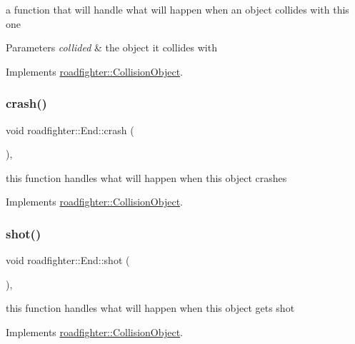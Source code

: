 a function that will handle what will happen when an object collides with this one 
\begin{DoxyParams}{Parameters}
{\em collided} & the object it collides with \\
\hline
\end{DoxyParams}


Implements \hyperlink{classroadfighter_1_1CollisionObject_a7eafa2fdc4463788b816fdd9370d28d9}{roadfighter\+::\+Collision\+Object}.

\mbox{\label{classroadfighter_1_1End_af88fbaf5ebd266bd153d0ba3f32ba0f8}} 
\subsubsection{\texorpdfstring{crash()}{crash()}}
{\footnotesize\ttfamily void roadfighter\+::\+End\+::crash (\begin{DoxyParamCaption}{ }\end{DoxyParamCaption})\hspace{0.3cm}{\ttfamily [override]}, {\ttfamily [virtual]}}

this function handles what will happen when this object crashes 

Implements \hyperlink{classroadfighter_1_1CollisionObject_a18f0f60a5a664d6fb554daac0d398a2c}{roadfighter\+::\+Collision\+Object}.

\mbox{\label{classroadfighter_1_1End_af81f5e854c8504a60afa11ea826aaec8}} 
\subsubsection{\texorpdfstring{shot()}{shot()}}
{\footnotesize\ttfamily void roadfighter\+::\+End\+::shot (\begin{DoxyParamCaption}{ }\end{DoxyParamCaption})\hspace{0.3cm}{\ttfamily [override]}, {\ttfamily [virtual]}}

this function handles what will happen when this object gets shot 

Implements \hyperlink{classroadfighter_1_1CollisionObject_a338a1071e6d5e25439e57c8673308dbb}{roadfighter\+::\+Collision\+Object}.

